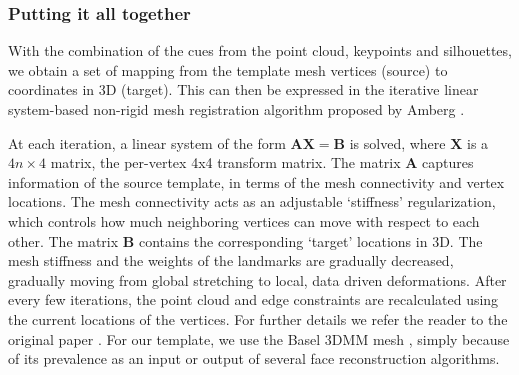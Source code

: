 \documentclass[10pt,twocolumn,letterpaper]{article}
\begin{document}
 \subsubsection{Putting it all together}
 With the combination of the cues from the point cloud, keypoints and silhouettes, we obtain a set of mapping from the template mesh vertices (source) to coordinates in 3D (target). This can then be expressed in the iterative linear system-based non-rigid mesh registration algorithm proposed by Amberg \etal \cite{amberg2007optimal}. 
 
 At each iteration, a linear system of the form $\mathbf{A}\mathbf{X} = \mathbf{B}$ is solved, where $\mathbf{X}$ is a $4n\times4$ matrix, the per-vertex 4x4 transform matrix. The matrix $\mathbf{A}$ captures information of the source template, in terms of the mesh connectivity and vertex locations. The mesh connectivity acts as an adjustable `stiffness' regularization, which controls how much neighboring vertices can move with respect to each other. The matrix 
 $\mathbf{B}$ contains the corresponding `target' locations in 3D. The mesh stiffness and the weights of the landmarks are gradually decreased, gradually moving from global stretching to local, data driven deformations. After every few iterations, the point cloud and edge constraints are recalculated using the current locations of the vertices. For further details we refer the reader to the original paper \cite{amberg2007optimal}. For our template, we use the Basel 3DMM mesh \cite{blanz1999morphable}, simply because of its prevalence as an input or output of several face reconstruction algorithms.





\end{document}

